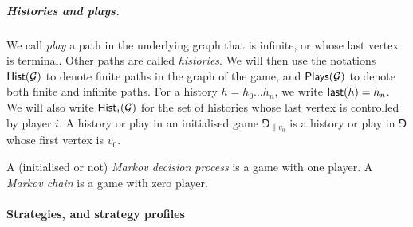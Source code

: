 \subparagraph*{Histories and plays.} We call \emph{play} a path in the underlying graph that is infinite, or whose last vertex is terminal.
Other paths are called \emph{histories}.
We will then use the notations $\mathsf{Hist}(\mathcal{G})$ to denote finite paths in the graph of the game, and $\mathsf{Plays}(\mathcal{G})$ to denote both finite and infinite paths. For a history $h = h_0 \dots h_n$, we write $\mathsf{last}(h) = h_n$.
We will also write $\mathsf{Hist}_i(\mathcal{G})$ for the set of histories whose last vertex is controlled by player $i$.
A history or play in an initialised game $\Game_{\|v_0}$ is a history or play in $\Game$ whose first vertex is $v_0$.




\begin{definition}
    A (initialised or not) \emph{Markov decision process} is a game with one player.
    A \emph{Markov chain} is a game with zero player.
\end{definition}




\paragraph*{Strategies, and strategy profiles}



